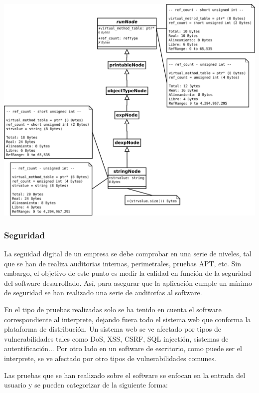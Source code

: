 \begin{center}
\includegraphics[scale=0.3]{memorySpaceStr.png} \\
\end{center}

\subsubsection{Seguridad}

La seguidad digital de un empresa se debe comprobar en una serie de niveles, tal que se han de realiza auditorias internas, perimetrales, pruebas APT, etc. Sin embargo, el objetivo de
este punto es medir la calidad en función de la seguridad del software desarrollado. Así, para asegurar que la aplicación cumple un mínimo de seguridad se han realizado una serie de 
auditorías al software. 

En el tipo de pruebas realizadas solo se ha tenido en cuenta el software correspondiente al interprete, dejando fuera todo el sistema web que conforma la plataforma de distribución. Un 
sistema web se ve afectado por tipos de vulnerabilidades tales como DoS, XSS, CSRF, SQL injectión, sistemas de autentificación... Por otro lado en un software de escritorio, como 
puede ser el interprete, se ve afectado por otro tipos de vulnerabilidades comunes.

Las pruebas que se han realizado sobre el software se enfocan en la entrada del usuario y se pueden categorizar de la siguiente forma:


